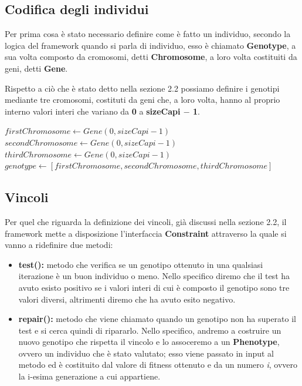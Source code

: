 \documentclass[a4paper, 11pt, oneside]{report}
\begin{document}
                \subsection{Codifica degli individui}
                \par \noindent Per prima cosa è stato necessario definire come è fatto un individuo, secondo la logica
                del framework quando si parla di individuo, esso è chiamato \textbf{Genotype}, a sua volta composto
                da cromosomi, detti \textbf{Chromosome}, a loro volta costituiti da geni, detti
                \textbf{Gene}.
                \medskip
                \par \noindent Rispetto a ciò che è stato detto nella sezione 2.2 possiamo definire
                i genotipi mediante tre cromosomi, costituti da geni che, a loro volta, hanno al proprio interno valori
                interi che variano da \textbf{0} a \textbf{sizeCapi $-$ 1}.
                \medskip
                \begin{algorithmic}[1]
                    \State $firstChromosome \gets Gene(0,sizeCapi-1)$
                    \State $secondChromosome \gets Gene(0,sizeCapi-1)$
                    \State $thirdChromosome \gets Gene(0,sizeCapi-1)$
                    \State $genotype \gets [firstChromosome, secondChromosome, thirdChromosome]$
                \end{algorithmic}

                \subsection{Vincoli}
                \par \noindent Per quel che riguarda la definizione dei vincoli, già discussi nella sezione 2.2,
                il framework mette a disposizione l'interfaccia \textbf{Constraint} attraverso la quale si vanno a ridefinire
                due metodi:
                \begin{itemize}
                    \item \textbf{test():} metodo che verifica se un genotipo ottenuto in una qualsiasi iterazione è un
                    buon individuo o meno.
                    Nello specifico diremo che il test ha avuto esisto positivo se i valori interi di cui è composto il
                    genotipo sono tre valori diversi, altrimenti diremo che ha avuto esito negativo.
                    \item \textbf{repair():} metodo che viene chiamato quando un genotipo non ha superato il test e si
                    cerca quindi di ripararlo.
                    Nello specifico, andremo a costruire un nuovo genotipo che rispetta il vincolo e lo assoceremo a un
                    \textbf{Phenotype}, ovvero un individuo che è stato valutato; esso viene passato in input al metodo
                    ed è costituito dal valore di fitness ottenuto e da un numero \emph{i}, ovvero la i-esima generazione
                    a cui appartiene.
                \end{itemize}
\end{document}
